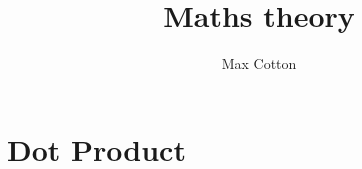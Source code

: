 \documentclass[10pt,a4paper]{article}
\title{Maths theory}
\author{Max Cotton}
\date{}
\begin{document}
\maketitle

\section{Dot Product}
\end{document}
